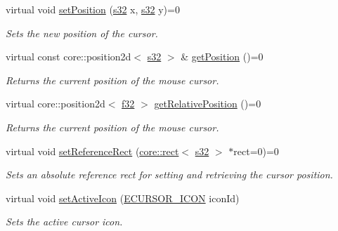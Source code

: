 \begin{DoxyCompactItemize}
virtual void \hyperlink{classirr_1_1gui_1_1ICursorControl_a3b0a59608d1d0810079349acfa01a79b}{set\+Position} (\hyperlink{namespaceirr_ac66849b7a6ed16e30ebede579f9b47c6}{s32} x, \hyperlink{namespaceirr_ac66849b7a6ed16e30ebede579f9b47c6}{s32} y)=0
\begin{DoxyCompactList}\small\item\em Sets the new position of the cursor. \end{DoxyCompactList}\item 
virtual const core\+::position2d$<$ \hyperlink{namespaceirr_ac66849b7a6ed16e30ebede579f9b47c6}{s32} $>$ \& \hyperlink{classirr_1_1gui_1_1ICursorControl_a65d9f6e734baa02be69b7e9f5fbdd565}{get\+Position} ()=0
\begin{DoxyCompactList}\small\item\em Returns the current position of the mouse cursor. \end{DoxyCompactList}\item 
virtual core\+::position2d$<$ \hyperlink{namespaceirr_a0277be98d67dc26ff93b1a6a1d086b07}{f32} $>$ \hyperlink{classirr_1_1gui_1_1ICursorControl_a8ba1cb0ff11edc5fb32cdadddece09f8}{get\+Relative\+Position} ()=0
\begin{DoxyCompactList}\small\item\em Returns the current position of the mouse cursor. \end{DoxyCompactList}\item 
virtual void \hyperlink{classirr_1_1gui_1_1ICursorControl_a2a7428ef716a60f8f4b86361a69b8770}{set\+Reference\+Rect} (\hyperlink{classirr_1_1core_1_1rect}{core\+::rect}$<$ \hyperlink{namespaceirr_ac66849b7a6ed16e30ebede579f9b47c6}{s32} $>$ $\ast$rect=0)=0
\begin{DoxyCompactList}\small\item\em Sets an absolute reference rect for setting and retrieving the cursor position. \end{DoxyCompactList}\item 
virtual void \hyperlink{classirr_1_1gui_1_1ICursorControl_af394700d5279b13cc0f2bcdad679469c}{set\+Active\+Icon} (\hyperlink{namespaceirr_1_1gui_aefee802dd632c5735703e40ef40f879b}{E\+C\+U\+R\+S\+O\+R\+\_\+\+I\+C\+ON} icon\+Id)
\begin{DoxyCompactList}\small\item\em Sets the active cursor icon. \end{DoxyCompactList}\item 
\mbox{\label{classirr_1_1gui_1_1ICursorControl_aeffb0659049614ced7a56b607177c3bb}} 

\end{DoxyCompactItemize}
